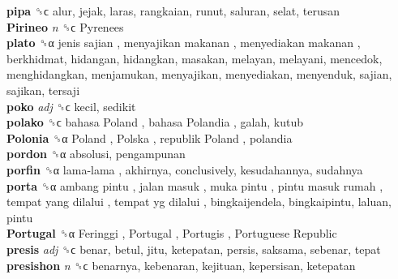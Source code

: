 \textbf{pipa} ␝ϲ  alur, jejak, laras, rangkaian, runut, saluran, selat, terusan  \\
\textbf{Pirineo} \emph{n}  ␝ϲ   Pyrenees   \\
\textbf{plato} ␝α   jenis sajian ,  menyajikan makanan ,  menyediakan makanan , berkhidmat, hidangan, hidangkan, masakan, melayan, melayani, mencedok, menghidangkan, menjamukan, menyajikan, menyediakan, menyenduk, sajian, sajikan, tersaji  \\
\textbf{poko} \emph{adj}  ␝ϲ  kecil, sedikit  \\
\textbf{polako} ␝ϲ   bahasa Poland ,  bahasa Polandia , galah, kutub  \\
\textbf{Polonia} ␝α   Poland ,  Polska ,  republik Poland , polandia  \\
\textbf{pordon} ␝α  absolusi, pengampunan  \\
\textbf{porfin} ␝α   lama-lama , akhirnya, conclusively, kesudahannya, sudahnya  \\
\textbf{porta} ␝α   ambang pintu ,  jalan masuk ,  muka pintu ,  pintu masuk rumah ,  tempat yang dilalui ,  tempat yg dilalui , bingkaijendela, bingkaipintu, laluan, pintu  \\
\textbf{Portugal} ␝α   Feringgi ,  Portugal ,  Portugis ,  Portuguese Republic   \\
\textbf{presis} \emph{adj}  ␝ϲ  benar, betul, jitu, ketepatan, persis, saksama, sebenar, tepat  \\
\textbf{presishon} \emph{n}  ␝ϲ  benarnya, kebenaran, kejituan, kepersisan, ketepatan  \\
